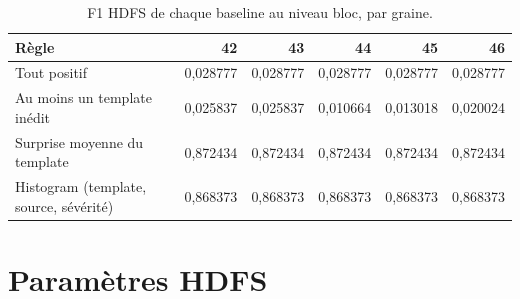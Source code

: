 \begin{table}[H]
\centering
\small
\caption{F1 HDFS de chaque baseline au niveau bloc, par graine.}
\label{tab:hdfs-baselines-seeds}
\begin{tabularx}{\textwidth}{Xrrrrr}
\toprule
\textbf{Règle} & \textbf{42} & \textbf{43} & \textbf{44} & \textbf{45} & \textbf{46} \\
\midrule
Tout positif & 0,028777 & 0,028777 & 0,028777 & 0,028777 & 0,028777 \\
Au moins un template inédit & 0,025837 & 0,025837 & 0,010664 & 0,013018 & 0,020024 \\
Surprise moyenne du template & 0,872434 & 0,872434 & 0,872434 & 0,872434 & 0,872434 \\
Histogram (template, source, sévérité) & 0,868373 & 0,868373 & 0,868373 & 0,868373 & 0,868373 \\
\bottomrule
\end{tabularx}
\end{table}

\section{Paramètres HDFS}

